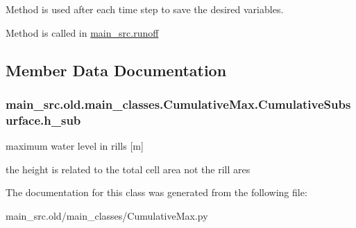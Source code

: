 Method is used after each time step to save the desired variables. 

Method is called in \hyperlink{namespacemain__src_1_1runoff}{main\-\_\-src.\-runoff} 

\subsection{Member Data Documentation}
\hypertarget{classmain__src_8old_1_1main__classes_1_1CumulativeMax_1_1CumulativeSubsurface_a5686f07171cc3c737c89b6213bb478e2}{
\subsubsection[{h\-\_\-sub}]{\setlength{\rightskip}{0pt plus 5cm}main\-\_\-src.\-old.\-main\-\_\-classes.\-Cumulative\-Max.\-Cumulative\-Subsurface.\-h\-\_\-sub}}\label{classmain__src_8old_1_1main__classes_1_1CumulativeMax_1_1CumulativeSubsurface_a5686f07171cc3c737c89b6213bb478e2}


maximum water level in rills \mbox{[}m\mbox{]} 

the height is related to the total cell area not the rill ares 

The documentation for this class was generated from the following file\-:\begin{DoxyCompactItemize}
\item 
main\-\_\-src.\-old/main\-\_\-classes/Cumulative\-Max.\-py\end{DoxyCompactItemize}
